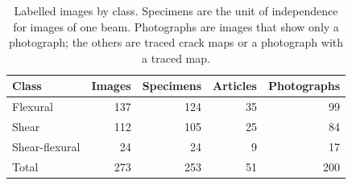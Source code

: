 \begin{table}[t]
\centering
\caption{Labelled images by class. Specimens are the unit of independence for images of one beam. Photographs are images that show only a photograph; the others are traced crack maps or a photograph with a traced map.}
\label{tab:dataset}
\begin{tabular}{l r r r r}
\toprule
Class & Images & Specimens & Articles & Photographs \\
\midrule
Flexural & 137 & 124 & 35 & 99 \\
Shear & 112 & 105 & 25 & 84 \\
Shear-flexural & 24 & 24 & 9 & 17 \\
\midrule
Total & 273 & 253 & 51 & 200 \\
\bottomrule
\end{tabular}
\end{table}
